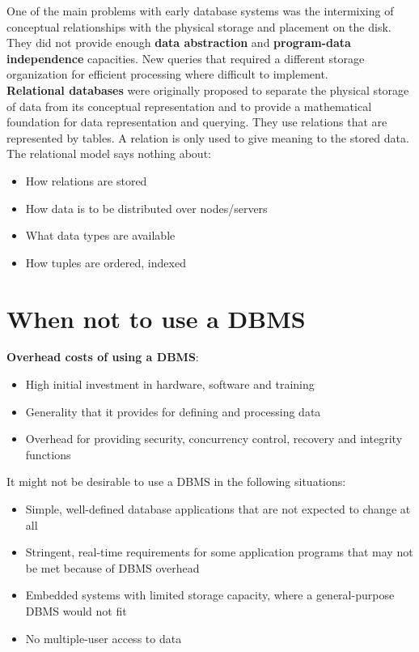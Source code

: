 One of the main problems with early database systems was the intermixing of conceptual relationships with the physical storage and placement on the disk. They did not provide enough \textbf{data abstraction} and \textbf{program-data independence} capacities. New queries that required a different storage organization for efficient processing where difficult to implement. \\

\textbf{Relational databases} were originally proposed to separate the physical storage of data from its conceptual representation and to provide a mathematical foundation for data representation and querying. They use relations that are represented by tables. A relation is only used to give meaning to the stored data.\\

The relational model says nothing about:\\

\begin{itemize}
    \item How relations are stored
    \item How data is to be distributed over nodes/servers
    \item What data types are available
    \item How tuples are ordered, indexed
\end{itemize}

\section{When not to use a DBMS}

\textbf{Overhead costs of using a DBMS}:

\begin{itemize}
    \item High initial investment in hardware, software and training
    \item Generality that it provides for defining and processing data
    \item Overhead for providing security, concurrency control, recovery and integrity functions
\end{itemize}

It might not be desirable to use a DBMS in the following situations:\\

\begin{itemize}
    \item Simple, well-defined database applications that are not expected to change at all
    \item Stringent, real-time requirements for some application programs that may not be met because of DBMS overhead
    \item Embedded systems with limited storage capacity, where a general-purpose DBMS would not fit
    \item No multiple-user access to data
\end{itemize}

